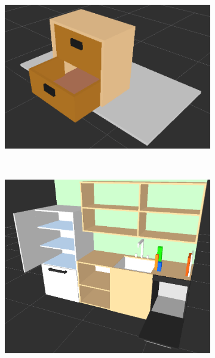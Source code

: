 \documentclass[letterpaper, 10 pt, conference]{ieeeconf}  %
\begin{document}
\begin{figure}
\centering
\begin{subfigure}[b]{0.3\textwidth}
    \includegraphics[trim = 0mm 0mm 0mm 0mm, width=\textwidth]{pictures/drawer_scene}
    \caption{}
    \label{drawer_scene}
  \end{subfigure}%
  ~ %
  \begin{subfigure}[b]{0.25\textwidth}
    \includegraphics[trim = 0mm 0mm 0mm 0mm, width=\textwidth]{pictures/countertop_scene}
    \caption{}
    \label{fig:countertop_scene}
  \end{subfigure}

\end{figure}
\end{document}
